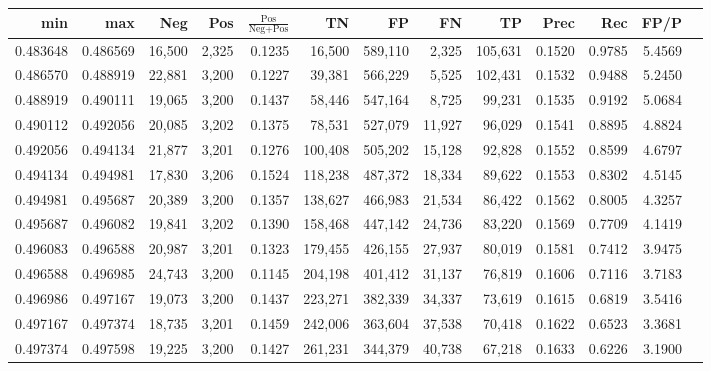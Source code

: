 \begin{tabular}{rrrrrrrrrrrrr}
\toprule
     min &      max &    Neg &   Pos & $\frac{\text{Pos}}{\text{Neg}+\text{Pos}}$ &      TN &      FP &      FN &      TP &   Prec &    Rec &   FP/P \\
\midrule
0.483648 & 0.486569 & 16,500 & 2,325 &                                     0.1235 &  16,500 & 589,110 &   2,325 & 105,631 & 0.1520 & 0.9785 & 5.4569 \\
0.486570 & 0.488919 & 22,881 & 3,200 &                                     0.1227 &  39,381 & 566,229 &   5,525 & 102,431 & 0.1532 & 0.9488 & 5.2450 \\
0.488919 & 0.490111 & 19,065 & 3,200 &                                     0.1437 &  58,446 & 547,164 &   8,725 &  99,231 & 0.1535 & 0.9192 & 5.0684 \\
0.490112 & 0.492056 & 20,085 & 3,202 &                                     0.1375 &  78,531 & 527,079 &  11,927 &  96,029 & 0.1541 & 0.8895 & 4.8824 \\
0.492056 & 0.494134 & 21,877 & 3,201 &                                     0.1276 & 100,408 & 505,202 &  15,128 &  92,828 & 0.1552 & 0.8599 & 4.6797 \\
0.494134 & 0.494981 & 17,830 & 3,206 &                                     0.1524 & 118,238 & 487,372 &  18,334 &  89,622 & 0.1553 & 0.8302 & 4.5145 \\
0.494981 & 0.495687 & 20,389 & 3,200 &                                     0.1357 & 138,627 & 466,983 &  21,534 &  86,422 & 0.1562 & 0.8005 & 4.3257 \\
0.495687 & 0.496082 & 19,841 & 3,202 &                                     0.1390 & 158,468 & 447,142 &  24,736 &  83,220 & 0.1569 & 0.7709 & 4.1419 \\
0.496083 & 0.496588 & 20,987 & 3,201 &                                     0.1323 & 179,455 & 426,155 &  27,937 &  80,019 & 0.1581 & 0.7412 & 3.9475 \\
0.496588 & 0.496985 & 24,743 & 3,200 &                                     0.1145 & 204,198 & 401,412 &  31,137 &  76,819 & 0.1606 & 0.7116 & 3.7183 \\
0.496986 & 0.497167 & 19,073 & 3,200 &                                     0.1437 & 223,271 & 382,339 &  34,337 &  73,619 & 0.1615 & 0.6819 & 3.5416 \\
0.497167 & 0.497374 & 18,735 & 3,201 &                                     0.1459 & 242,006 & 363,604 &  37,538 &  70,418 & 0.1622 & 0.6523 & 3.3681 \\
0.497374 & 0.497598 & 19,225 & 3,200 &                                     0.1427 & 261,231 & 344,379 &  40,738 &  67,218 & 0.1633 & 0.6226 & 3.1900 \\

\end{tabular}
